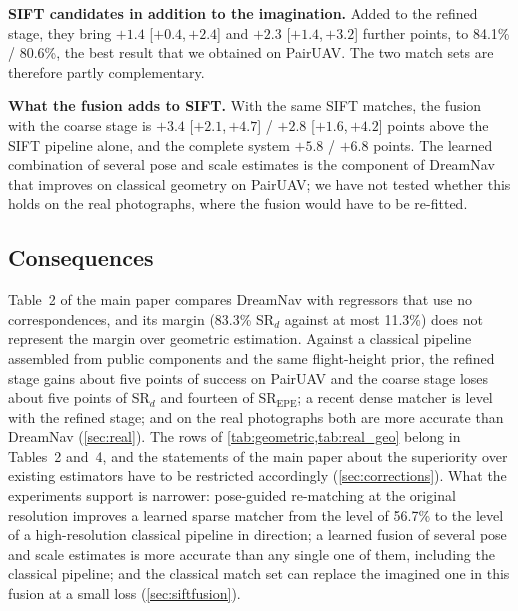 \documentclass[10pt,twocolumn,letterpaper]{article}
\newcommand{\SRd}{SR$_{d}$}
\newcommand{\SRe}{SR$_{\mathrm{EPE}}$}
\newcommand{\ci}[2]{{\scriptsize[\ensuremath{#1},\,\ensuremath{#2}]}}
\begin{document}
\noindent\textbf{SIFT candidates in addition to the imagination.} Added to the refined stage, they bring \ensuremath{+1.4}{} \ci{\ensuremath{+0.4}}{\ensuremath{+2.4}} and \ensuremath{+2.3}{} \ci{\ensuremath{+1.4}}{\ensuremath{+3.2}} further points, to 84.1\% / 80.6\%, the best result that we obtained on PairUAV. The two match sets are therefore partly complementary.

\noindent\textbf{What the fusion adds to SIFT.} With the same SIFT matches, the fusion with the coarse stage is \ensuremath{+3.4}{} \ci{\ensuremath{+2.1}}{\ensuremath{+4.7}} / \ensuremath{+2.8}{} \ci{\ensuremath{+1.6}}{\ensuremath{+4.2}} points above the SIFT pipeline alone, and the complete system \ensuremath{+5.8}{} / \ensuremath{+6.8}{} points. The learned combination of several pose and scale estimates is the component of DreamNav that improves on classical geometry on PairUAV; we have not tested whether this holds on the real photographs, where the fusion would have to be re-fitted.

\subsection{Consequences}
\label{sec:geoconsequences}

Table~2 of the main paper compares DreamNav with regressors that use no correspondences, and its margin (83.3\% \SRd{} against at most 11.3\%) does not represent the margin over geometric estimation. Against a classical pipeline assembled from public components and the same flight-height prior, the refined stage gains about five points of success on PairUAV and the coarse stage loses about five points of \SRd{} and fourteen of \SRe; a recent dense matcher is level with the refined stage; and on the real photographs both are more accurate than DreamNav (\cref{sec:real}). The rows of \cref{tab:geometric,tab:real_geo} belong in Tables~2 and~4, and the statements of the main paper about the superiority over existing estimators have to be restricted accordingly (\cref{sec:corrections}). What the experiments support is narrower: pose-guided re-matching at the original resolution improves a learned sparse matcher from the level of 56.7\% to the level of a high-resolution classical pipeline in direction; a learned fusion of several pose and scale estimates is more accurate than any single one of them, including the classical pipeline; and the classical match set can replace the imagined one in this fusion at a small loss (\cref{sec:siftfusion}).
\end{document}
